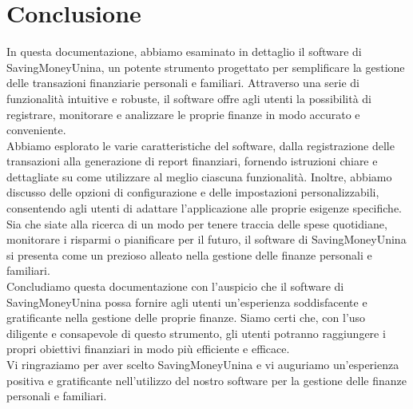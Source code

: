 \chapter{Conclusione}

In questa documentazione, abbiamo esaminato in dettaglio il software di SavingMoneyUnina,
un potente strumento progettato per semplificare la gestione delle transazioni finanziarie
personali e familiari. Attraverso una serie di funzionalità intuitive e robuste, il software
offre agli utenti la possibilità di registrare, monitorare e analizzare le proprie finanze in modo accurato e conveniente.\\

Abbiamo esplorato le varie caratteristiche del software, dalla registrazione delle transazioni
alla generazione di report finanziari, fornendo istruzioni chiare e dettagliate su come
utilizzare al meglio ciascuna funzionalità. Inoltre, abbiamo discusso delle opzioni di
configurazione e delle impostazioni personalizzabili, consentendo agli utenti di adattare
l'applicazione alle proprie esigenze specifiche.\\

Sia che siate alla ricerca di un modo per tenere traccia delle spese quotidiane,
monitorare i risparmi o pianificare per il futuro, il software di SavingMoneyUnina
si presenta come un prezioso alleato nella gestione delle finanze personali e familiari.\\

Concludiamo questa documentazione con l'auspicio che il software di SavingMoneyUnina
possa fornire agli utenti un'esperienza soddisfacente e gratificante nella gestione
delle proprie finanze. Siamo certi che, con l'uso diligente e consapevole di questo
strumento, gli utenti potranno raggiungere i propri obiettivi finanziari in modo più efficiente e efficace.\\

Vi ringraziamo per aver scelto SavingMoneyUnina e vi auguriamo un'esperienza positiva
e gratificante nell'utilizzo del nostro software per la gestione delle finanze personali e familiari.
